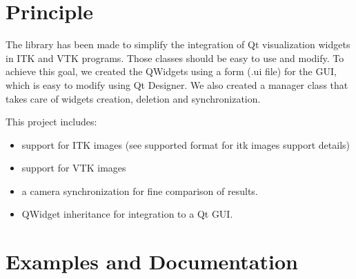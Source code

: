 \documentclass{InsightArticle}
\begin{document}
\section{Principle}
The library has been made to simplify the integration of Qt visualization widgets in ITK and VTK programs. Those classes should be easy to use and modify. To achieve this goal, we created the QWidgets using a form (.ui file) for the GUI, which is easy to modify using Qt Designer. We also created a manager class that takes care of widgets creation, deletion and synchronization.

This project includes:
\begin{itemize}
  \item support for ITK images (see supported format for itk images support details)
  \item support for VTK images
  \item a camera synchronization for fine comparison of results.
  \item QWidget inheritance for integration to a Qt GUI.
\end{itemize}


\section{Examples and Documentation}
\end{document}
